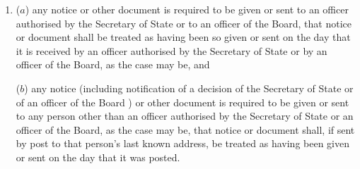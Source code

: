 \documentclass[12pt,a4paper]{article}
\begin{document}
\begin{enumerate}\item[]
($a$) any notice or other document is required to be given or sent 
to an officer authorised by the Secretary of State
or to an officer of the Board,  %
that notice or document shall be treated as having been so given or sent on the day that it is received 
by an officer authorised by the Secretary of State
or by an officer of the Board,  %
as the case may be, and

($b$) any notice (including notification of a decision of the Secretary of State
or of an officer of the Board%
) or other document is required to be given or sent to any person other than 
an officer  %
authorised by the Secretary of State
or an officer of the Board,  %
as the case may be, that notice or document shall, if sent by post to that person’s last known address, be treated as having been given or sent on the day that it was posted.\end{enumerate}


\end{document}
